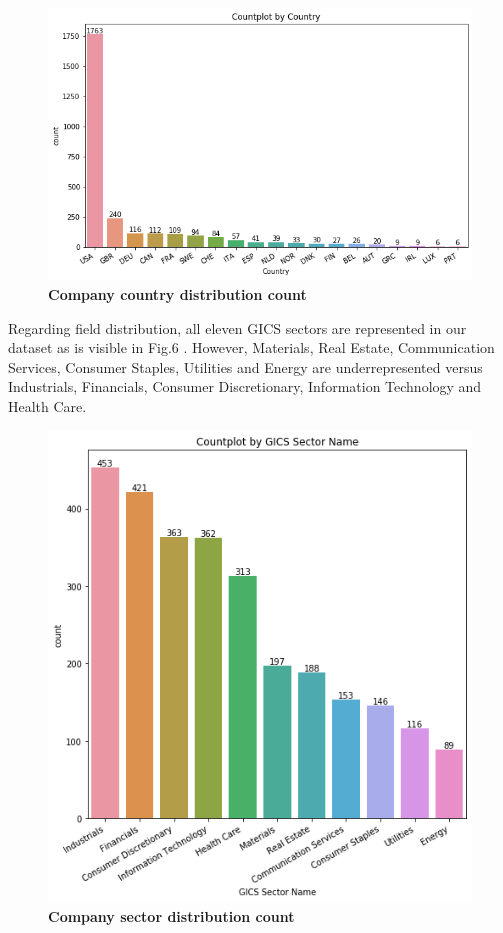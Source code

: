 \documentclass[12pt]{report}
\begin{document}
\begin{figure}[h!]
\centering
\includegraphics[scale=0.5]{country_distribution.png}
\caption{\textbf{Company country distribution count}}
\label{fig:countries}
\end{figure}

Regarding field distribution, all eleven GICS sectors are represented in our dataset as is visible in Fig.6 . However, Materials, Real Estate, Communication Services, Consumer Staples, Utilities and Energy are underrepresented versus Industrials, Financials, Consumer Discretionary, Information Technology and Health Care. 
\begin{figure}[h!]
\centering
\includegraphics[scale=0.5]{sector_distribution.png}
\caption{\textbf{Company sector distribution count}}
\label{fig:sectors}
\end{figure}
 
\end{document}
